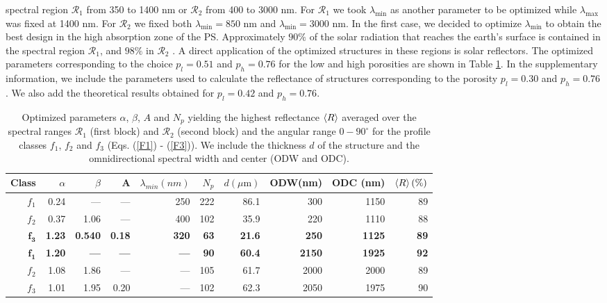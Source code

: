 \documentclass[a4paper,fleqn]{cas-sc}
\begin{document}
spectral region $\mathcal R_1$ from 350 to
1400 nm or $\mathcal R_2$ from 400 to 3000 nm. For $\mathcal R_1$ we took
$\lambda_{\min}$ as another parameter to be optimized while $\lambda_{\max}$
was fixed at 1400 nm. For $\mathcal R_2$ we fixed both
$\lambda_{\min}=850$ nm and $\lambda_{\min}=3000$ nm.
In the first case, we decided to optimize $\lambda_{\min}$ to
obtain the best design in the high absorption zone of the PS.
Approximately $90\%$ of the solar radiation that reaches the
earth's surface is contained in the spectral region
$\mathcal R_1$, and $98\%$ in $\mathcal R_2$ \cite{Bird1983}.
A direct
application of the optimized structures in these regions is solar
reflectors. The
optimized parameters corresponding to the choice $p_l=0.51$ and
$p_h=0.76$ for the low and high porosities
are shown in Table \ref{tab:tableA}. In the supplementary
information, we include the parameters used to calculate the
reflectance of structures corresponding to the porosity $p_l=0.30$
and $p_h=0.76$. We also add the theoretical results obtained for
$p_l=0.42$ and $p_h=0.76$.

\begin{table}
        \centering
        \addtolength{\tabcolsep}{-2pt}
        \begin{tabular}{rrrrrrrrrr}
                Class&$\alpha$&$\beta$&A&$\lambda_{min}(nm)$&$N_{p}$&$d(\mu\text{m})$       &ODW(nm)&ODC (nm)&$\braket{R}(\%)$\\
                \hline
                \hline
                $f_{1}$     &0.24    &---      &---     &250&222   &86.1    &300    &1150    &89\\
                $f_{2}$     &0.37    &1.06     &---     &400&102   &35.9    &220    &1110    &88\\
                $\bm{f_{3}}$&\bf 1.23&\bf 0.540&\bf 0.18&\bf 320&\bf 63&\bf 21.6&\bf 250&\bf 1125&\bf 89\\
                \hline
                $\bm{f_{1}}$&\bf 1.20&\bf ---  &\bf --- &\bf ---&\bf 90&\bf 60.4&\bf 2150&\bf 1925&\bf 92\\
                $f_{2}$     &1.08    &1.86     &---  &---  &105   &61.7    &2000    &2000    &89\\
                $f_{3}$     &1.01    &1.95     &0.20  &---  &102   &62.3    &2050    &1975    &90\\
        \end{tabular}
        \caption{Optimized parameters $\alpha$, $\beta$, $A$ and $N_p$ yielding the highest
                reflectance $\braket{R}$ averaged over the spectral ranges
                $\mathcal R_1$ (first block) and $\mathcal R_2$ (second block) and
                the angular range $0-90^\circ$ for the profile classes $f_1$, $f_2$ and
                $f_3$ (Eqs. (\ref{F1}) - (\ref{F3})). We include the thickness $d$
                of the structure and the omnidirectional spectral
                width and center (ODW and ODC).}
        \label{tab:tableA}
\end{table}
\end{document}
